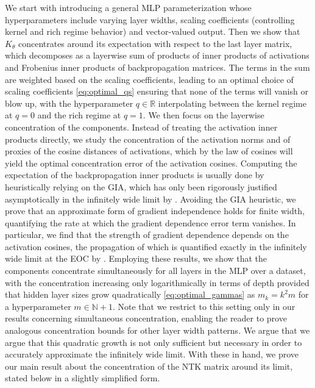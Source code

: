 \documentclass[twoside,11pt]{article}
\newcommand{\R}{\mathbb{R}}
\newcommand{\N}{\mathbb{N}}
\begin{document}
We start with introducing a general MLP parameterization whose hyperparameters include varying layer widths, scaling coefficients (controlling kernel and rich regime behavior) and vector-valued output. Then we show that $K_\theta$ concentrates around its expectation with respect to the last layer matrix, which decomposes as a layerwise sum of products of inner products of activations and Frobenius inner products of backpropagation matrices. The terms in the sum are weighted based on the scaling coefficients, leading to an optimal choice of scaling coefficients \eqref{eq:optimal_qs} ensuring that none of the terms will vanish or blow up, with the hyperparameter $q \in \R$ interpolating between the kernel regime at $q=0$ and the rich regime at $q=1$. We then focus on the layerwise concentration of the components. Instead of treating the activation inner products directly, we study the concentration of the activation norms and of proxies of the cosine distances of activations, which by the law of cosines will yield the optimal concentration error of the activation cosines. Computing the expectation of the backpropagation inner products is usually done by heuristically relying on the GIA, which has only been rigorously justified asymptotically in the infinitely wide limit by \citep{Yang2020}. Avoiding the GIA heuristic, we prove that an approximate form of gradient independence holds for finite width, quantifying the rate at which the gradient dependence error term vanishes. In particular, we find that the strength of gradient dependence depends on the activation cosines, the propagation of which is quantified exactly in the infinitely wide limit at the EOC by \citet{mlpsateoc1}. Employing these results, we show that the components concentrate simultaneously for all layers in the MLP over a dataset, with the concentration increasing only logarithmically in terms of depth provided that hidden layer sizes grow quadratically \eqref{eq:optimal_gammas} as $m_k = k^2 m$ for a hyperparameter $m \in \N+1$. Note that we restrict to this setting only in our results concerning simultaneous concentration, enabling the reader to prove analogous concentration bounds for other layer width patterns. We argue that we argue that this quadratic growth is not only sufficient but necessary in order to accurately approximate the infinitely wide limit. With these in hand, we prove our main result about the concentration of the NTK matrix around its limit, stated below in a slightly simplified form.
\end{document}
